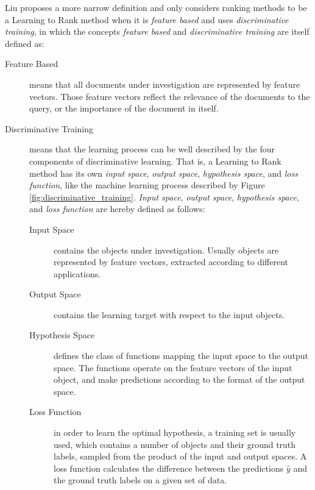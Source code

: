 Liu \cite{Liu2007} proposes a more narrow definition and only considers ranking methods to be a Learning to Rank method when it is \emph{feature based} and uses \emph{discriminative training}, in which the concepts \emph{feature based} and \emph{discriminative training} are itself defined as:
\begin{description}
\item[Feature Based]{means that all documents under investigation are represented by feature vectors. Those feature vectors reflect the relevance of the documents to the query, or the importance of the document in itself.}
\item[Discriminative Training]{means that the learning process can be well described by the four components of discriminative learning. That is, a Learning to Rank method has its own \emph{input space}, \emph{output space}, \emph{hypothesis space}, and \emph{loss function}, like the machine learning process described by Figure \ref{fig:discriminative_training}. \emph{Input space}, \emph{output space}, \emph{hypothesis space}, and \emph{loss function} are hereby defined as follows:
	\begin{description}
	\item[Input Space]{contains the objects under investigation. Usually objects are represented by feature vectors, extracted according to different applications.}
	\item[Output Space]{contains the learning target with respect to the input objects.}
	\item[Hypothesis Space]{defines the class of functions mapping the input space to the output space. The functions operate on the feature vectors of the input object, and make predictions according to the format of the output space.}
	\item[Loss Function]{in order to learn the optimal hypothesis, a training set is usually used, which contains a number of objects and their ground truth labels, sampled from the product of the input and output spaces. A loss function calculates the difference between the predictions $\hat{y}$ and the ground truth labels on a given set of data.}
	\end{description}
	}
\end{description}


